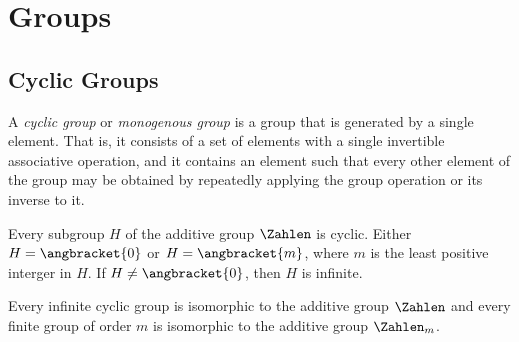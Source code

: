 	
\chapter{Groups}



\section{Cyclic Groups}
\begin{definition}
	A \textit{cyclic group} or \textit{monogenous group} is a group that is generated by a single element. That is, it consists of a set of elements with a single invertible associative operation, and it contains an element such that every other element of the group may be obtained by repeatedly applying the group operation or its inverse to it.
\end{definition}
\begin{theorem}
	Every subgroup $ H $ of the additive group $ \Zahlen $ is cyclic. Either $ H = \angbracket{0} $ or $ H = \angbracket{m} $, where $ m $ is the least positive interger in $ H $. If $ H \neq \angbracket{0} $, then $ H $ is infinite.
\end{theorem}
\begin{theorem}
	Every infinite cyclic group is isomorphic to the additive group $ \Zahlen $ and every finite group of order $ m $ is isomorphic to the additive group $ \Zahlen_m $.
\end{theorem}

